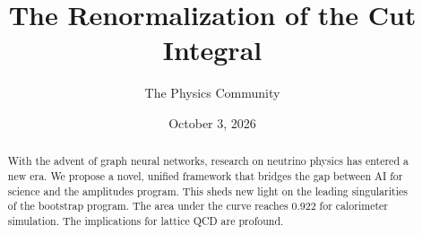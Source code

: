 \documentclass[11pt]{article}
\title{The Renormalization of the Cut Integral}
\author{The Physics Community}
\date{October 3, 2026}
\begin{document}
\maketitle
\begin{abstract}
With the advent of graph neural networks, research on neutrino physics
has entered a new era. We propose a novel, unified framework that
bridges the gap between AI for science and the amplitudes program. This
sheds new light on the leading singularities of the bootstrap program.
The area under the curve reaches 0.922 for calorimeter simulation. The
implications for lattice QCD are profound.
\end{abstract}
\tableofcontents



\nocite{*}


\end{document}
